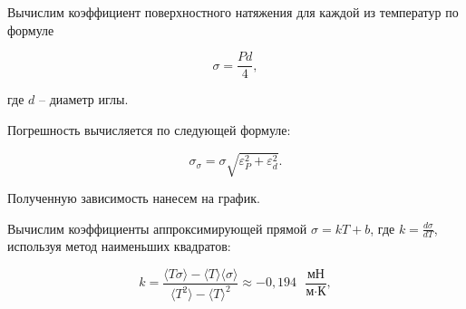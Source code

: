 \documentclass[a4paper,12pt]{article} %
\begin{document}
{\medskip
\medskip

\noindent Вычислим коэффициент поверхностного натяжения для каждой из температур по формуле

\medskip

\begin{equation}
\sigma = \frac{Pd}{4},
\end{equation}

\medskip

\noindent где $ d $ -- диаметр иглы. 

\noindent Погрешность вычисляется по следующей формуле:

\begin{equation}
\sigma_\sigma = \sigma\sqrt{\varepsilon^2_P + \varepsilon^2_d}.
\end{equation}
\medskip

\noindent Полученную зависимость нанесем на график. 

\begin{figure}[h!]
\end{figure}

\medskip

\noindent Вычислим коэффициенты аппроксимирующей прямой $ \sigma = kT + b $, где $ \displaystyle k = \frac{d\sigma}{dT} $, используя метод наименьших квадратов:

\medskip

\[ k = \frac{\langle T\sigma \rangle - \langle T \rangle \langle \sigma \rangle}{\langle T^2 \rangle - \langle T \rangle ^2} \approx -0,194\text{ } \frac{\text{мН}}{\text{м}\cdot\text{К}},\]

}
\end{document}
